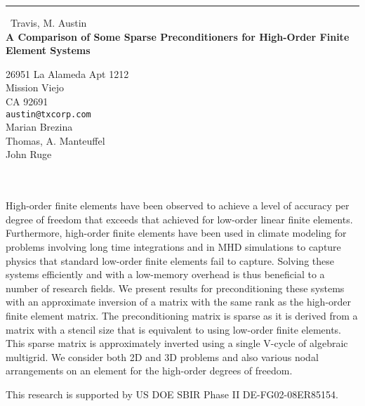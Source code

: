 \documentclass{report}
\begin{document}
\begin{center}
\rule{6in}{1pt} \
{\large Travis, M. Austin \\
{\bf A Comparison of Some Sparse Preconditioners for High-Order Finite Element Systems}}

26951 La Alameda Apt 1212 \\ Mission Viejo \\ CA 92691
\\
{\tt austin@txcorp.com}\\
Marian Brezina\\
Thomas, A.  Manteuffel\\
John Ruge\\
   \\
   \\
   \end{center}

High-order finite elements have been observed to achieve a level of
accuracy per degree of freedom that exceeds that achieved for low-order
linear finite elements. Furthermore, high-order finite elements have been
used in climate modeling for problems involving long time integrations
and in MHD simulations to capture physics that standard low-order finite
elements fail to capture. Solving these systems efficiently and with a
low-memory overhead is thus beneficial to a number of research fields. We
present results for preconditioning these systems with an approximate
inversion of a matrix with the same rank as the high-order finite element
matrix. The preconditioning matrix is sparse as it is derived from a
matrix with a stencil size that is equivalent to using low-order finite
elements. This sparse matrix is approximately inverted using a single
V-cycle of algebraic multigrid. We consider both 2D and 3D problems and
also various nodal arrangements on an element for the high-order degrees
of freedom.

This research is supported by US DOE SBIR Phase II DE-FG02-08ER85154.
\end{document}
